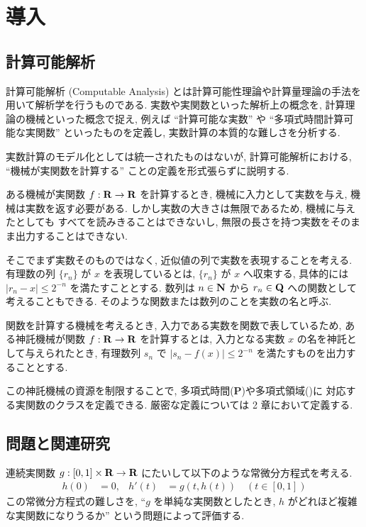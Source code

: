 \section{導入}

\subsection{計算可能解析}

計算可能解析 (Computable Analysis) とは計算可能性理論や計算量理論の手法を用いて解析学を行うものである. 
実数や実関数といった解析上の概念を, 計算理論の機械といった概念で捉え,
例えば ``計算可能な実数'' や ``多項式時間計算可能な実関数'' といったものを定義し, 
実数計算の本質的な難しさを分析する.

実数計算のモデル化としては統一されたものはないが,
計算可能解析における, ``機械が実関数を計算する'' ことの定義を形式張らずに説明する.

ある機械が実関数 $f:\mathbf R \to \mathbf R$ を計算するとき,
機械に入力として実数を与え, 機械は実数を返す必要がある.
しかし実数の大きさは無限であるため, 機械に与えたとしても
すべてを読みきることはできないし,
無限の長さを持つ実数をそのまま出力することはできない.

そこでまず実数そのものではなく, 近似値の列で実数を表現することを考える.
有理数の列 $\{r_n\}$ が $x$ を表現しているとは,
$\{r_n\}$ が $x$ へ収束する, 具体的には $|r_n - x| \le 2^{-n}$ を満たすこととする.
数列は $n \in \mathbf N$ から $r_n \in \mathbf Q$ への関数として考えることもできる.
そのような関数または数列のことを実数の名と呼ぶ.

関数を計算する機械を考えるとき,
入力である実数を関数で表しているため,
ある神託機械が関数 $f:\mathbf R \to \mathbf R$ を計算するとは,
入力となる実数 $x$ の名を神託として与えられたとき,
有理数列 $s_n$ で $|s_n - f(x)| \le 2^{-n}$ を満たすものを出力することとする.

この神託機械の資源を制限することで, 多項式時間({\bf P})や多項式領域(\PSPACE)に
対応する実関数のクラスを定義できる.
厳密な定義については 2 章において定義する.

\subsection{問題と関連研究}

連続実関数 $g : [0,1] \times \mathbf R \to \mathbf R$ にたいして以下のような常微分方程式を考える. 
\begin{align}
 \label{eq:ode}
 h(0) & = 0, &
 h'(t) & = g(t,h(t)) \quad (t \in [0,1])
\end{align}
この常微分方程式の難しさを, ``$g$ を単純な実関数としたとき, 
$h$ がどれほど複雑な実関数になりうるか'' という問題によって評価する.

